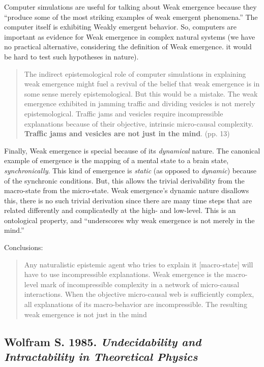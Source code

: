 \documentclass{article}
\newcommand{\ti}[1]{\textit{#1}}
\newcommand{\tb}[1]{\textbf{#1}}
\newcommand{\annbibtitle}[2]{\subsection*{#1. \ti{#2}}}
\begin{document}
Computer simulations are useful for talking about Weak emergence because they ``produce some of the most striking examples of weak emergent phenomena.'' The computer itself is exhibiting Weakly emergent behavior. So, computers are important as evidence for Weak emergence in complex natural systems (we have no practical alternative, considering the definition of Weak emergence. it would be hard to test such hypotheses in nature).

\begin{quote}
The indirect epistemological role of computer simulations in explaining weak emergence might fuel a revival of the belief that weak emergence is in some sense merely epistemological. But this would be a mistake. The weak emergence exhibited in jamming traffic and dividing vesicles is not merely epistemological. Traffic jams and vesicles require incompressible explanations because of their objective, intrinsic micro-causal complexity. \tb{Traffic jams and vesicles are not just in the mind}. (pp. 13)
\end{quote}

Finally, Weak emergence is special because of its \ti{dynamical} nature. The canonical example of emergence is the mapping of a mental state to a brain state, \ti{synchronically}. This kind of emergence is \ti{static} (as opposed to \ti{dynamic}) because of the synchronic conditions. But, this allows the trivial derivability from the macro-state from the micro-state. Weak emergence's dynamic nature disallows this, there is no such trivial derivation since there are many time steps that are related differently and complicatedly at the high- and low-level. This is an ontological property, and ``underscores why weak emergence is not merely in the mind.''

Conclusions:
\begin{quote}
    Any naturalistic epistemic agent who tries to explain it [macro-state] will have to use incompressible explanations. Weak emergence is the macro-level mark of incompressible complexity in a network of micro-causal interactions. When the objective micro-causal web is sufficiently complex, all explanations of its macro-behavior are incompressible. The resulting weak emergence is not just in the mind
\end{quote}

\annbibtitle{Wolfram S. 1985}{Undecidability and Intractability in Theoretical Physics}
\end{document}
